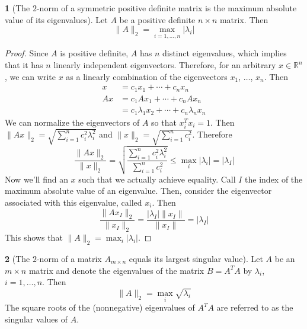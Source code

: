 \documentclass[12pt]{article}
\theoremstyle{definition}
\newtheorem{theorem}{\color{ForestGreen}{\textbf{Theorem}}}
\newcommand{\R}{\mathbb{R}}
\newcommand{\norm}[1]{\lVert#1\rVert}
\theoremstyle{definition}
\begin{document}
\begin{theorem}[The $2$-norm of a symmetric positive definite matrix is the maximum absolute value of its eigenvalues]
Let $A$ be a positive definite $n \times n$ matrix. Then 
\begin{equation}
	\norm{A}_2 = \max_{i=1,\ldots, n} |\lambda_i|
\end{equation}
\end{theorem}
\begin{proof}
Since $A$ is positive definite, $A$ has $n$ distinct eigenvalues, which implies that it has $n$ linearly independent eigenvectors. Therefore, for an arbitrary $x \in \R^n$, we can write $x$ as a linearly combination of the eigenvectors $x_1$, $\ldots$, $x_n$. Then
\begin{align*}
	x &= c_1 x_1 + \cdots + c_n x_n \\
	A x &= c_1 A x_1 + \cdots + c_n A x_n \\
	&= c_1 \lambda_1 x_2 + \cdots + c_n \lambda_n x_n 
\end{align*}
We can normalize the eigenvectors of $A$ so that $x_i^T x_i = 1$. Then $\norm{Ax}_2 = \sqrt{\sum_{i=1}^n c_i^2 \lambda_i^2}$ and $\norm{x}_2 = \sqrt{\sum_{i=1}^n c_i^2}$. Therefore 
\begin{equation}
	\frac{\norm{Ax}_2}{\norm{x}_2} = \sqrt{\frac{\sum_{i=1}^n c_i^2 \lambda_i^2}{\sum_{i=1}^n c_i^2}} \leq \max_i |\lambda_i| = |\lambda_I|
\end{equation}
Now we'll find an $x$ such that we actually achieve equality. Call $I$ the index of the maximum absolute value of an eigenvalue. Then, consider the eigenvector associated with this eigenvalue, called $x_i$. Then
\begin{equation}
	\frac{\norm{Ax_I}_2}{\norm{x_I}_2} = \frac{|\lambda_I|\norm{x_I}}{\norm{x_I}} = |\lambda_I|
\end{equation}
This shows that $\norm{A}_2 =  \max_i |\lambda_i|$.
\end{proof}

\begin{theorem}[The $2$-norm of a matrix $A_{m \times n}$ equals its largest singular value]
Let $A$ be an $m \times n$ matrix and denote the eigenvalues of the matrix $B = A^TA$ by $\lambda_i$, $i=1,\ldots, n$. Then 
\begin{equation}
	\norm{A}_2 = \max_i \sqrt{\lambda_i}
\end{equation}
The square roots of the (nonnegative) eigenvalues of $A^TA$ are referred to as the singular values of $A$.
\end{theorem}
\end{document}
